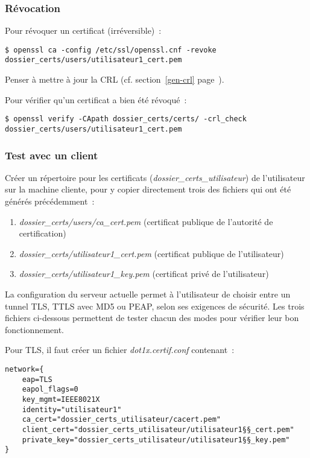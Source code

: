 \subsubsection{Révocation}

Pour révoquer un certificat (irréversible)~: 

\begin{lstlisting}
$ openssl ca -config /etc/ssl/openssl.cnf -revoke dossier_certs/users/utilisateur1_cert.pem
\end{lstlisting}

Penser à mettre à jour la CRL (cf. section~\ref{gen-crl} page~\pageref{gen-crl}).

Pour vérifier qu'un certificat a bien été révoqué~:

\begin{lstlisting}
$ openssl verify -CApath dossier_certs/certs/ -crl_check dossier_certs/users/utilisateur1_cert.pem
\end{lstlisting}

\label{tests-certificats}
\subsubsection{Test avec un client}

Créer un répertoire pour les certificats (\emph{dossier\_certs\_utilisateur}) de l'utilisateur sur la machine cliente, pour y copier directement trois des fichiers qui ont été générés précédemment~:

\begin{enumerate}
\item \emph{dossier\_certs/users/ca\_cert.pem} (certificat publique de l'autorité de certification)
\item \emph{dossier\_certs/utilisateur1\_cert.pem} (certificat publique de l'utilisateur)
\item \emph{dossier\_certs/utilisateur1\_key.pem} (certificat privé de l'utilisateur)
\end{enumerate}

La configuration du serveur actuelle permet à l'utilisateur de choisir entre un tunnel TLS, TTLS avec MD5 ou PEAP, selon ses exigences de sécurité. Les trois fichiers ci-dessous permettent de tester chacun des modes pour vérifier leur bon fonctionnement.

Pour TLS, il faut créer un fichier \emph{dot1x.certif.conf} contenant~:

\begin{lstlisting}
network={
    eap=TLS
    eapol_flags=0
    key_mgmt=IEEE8021X
    identity="utilisateur1"
    ca_cert="dossier_certs_utilisateur/cacert.pem"
    client_cert="dossier_certs_utilisateur/utilisateur1§§_cert.pem"
    private_key="dossier_certs_utilisateur/utilisateur1§§_key.pem"
}
\end{lstlisting}

